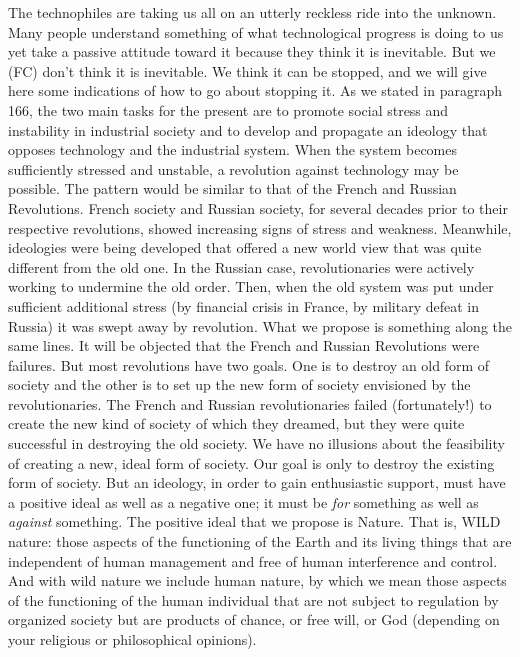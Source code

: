  The technophiles are taking us all on an utterly reckless ride into the unknown. Many people understand something of what technological progress is doing to us yet take a passive attitude toward it because they think it is inevitable. But we (FC) don’t think it is inevitable. We think it can be stopped, and we will give here some indications of how to go about stopping it.
 As we stated in paragraph 166, the two main tasks for the present are to promote social stress and instability in industrial society and to develop and propagate an ideology that opposes technology and the industrial system. When the system becomes sufficiently stressed and unstable, a revolution against technology may be possible. The pattern would be similar to that of the French and Russian Revolutions. French society and Russian society, for several decades prior to their respective revolutions, showed increasing signs of stress and weakness. Meanwhile, ideologies were being developed that offered a new world view that was quite different from the old one. In the Russian case, revolutionaries were actively working to undermine the old order. Then, when the old system was put under sufficient additional stress (by financial crisis in France, by military defeat in Russia) it was swept away by revolution. What we propose is something along the same lines.
 It will be objected that the French and Russian Revolutions were failures. But most revolutions have two goals. One is to destroy an old form of society and the other is to set up the new form of society envisioned by the revolutionaries. The French and Russian revolutionaries failed (fortunately!) to create the new kind of society of which they dreamed, but they were quite successful in destroying the old society. We have no illusions about the feasibility of creating a new, ideal form of society. Our goal is only to destroy the existing form of society.
 But an ideology, in order to gain enthusiastic support, must have a positive ideal as well as a negative one; it must be {\em for} something as well as {\em against} something. The positive ideal that we propose is Nature. That is, WILD nature: those aspects of the functioning of the Earth and its living things that are independent of human management and free of human interference and control. And with wild nature we include human nature, by which we mean those aspects of the functioning of the human individual that are not subject to regulation by organized society but are products of chance, or free will, or God (depending on your religious or philosophical opinions).
